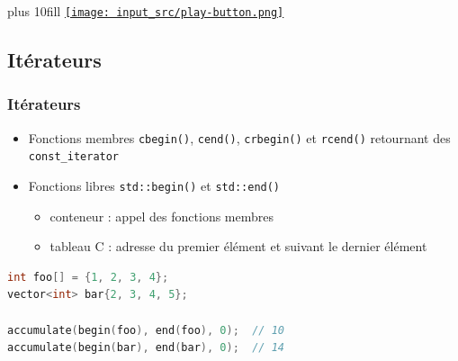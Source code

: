 \documentclass[C++.tex]{subfiles}
\begin{document}
\begin{frame}[fragile]
	\vskip 10mm plus 10fill
	\hfill
	\href{https://godbolt.org/#g:!((g:!((g:!((h:codeEditor,i:(filename:'1',fontScale:14,fontUsePx:'0',j:1,lang:c%2B%2B,selection:(endColumn:1,endLineNumber:17,positionColumn:1,positionLineNumber:17,selectionStartColumn:1,selectionStartLineNumber:17,startColumn:1,startLineNumber:17),source:'%23include+%3Ciostream%3E%0A%23include+%3Cbitset%3E%0A%0Aint+main()%0A%7B%0A++std::bitset%3C5%3E+foo%3B%0A++std::cout+%3C%3C+std::boolalpha+%3C%3C+foo.all()+%3C%3C+!'%5Cn!'%3B%0A%0A++foo.set(2)%3B%0A++std::cout+%3C%3C+std::boolalpha+%3C%3C+foo.all()+%3C%3C+!'%5Cn!'%3B%0A++std::cout+%3C%3C+foo.to_ullong()+%3C%3C+!'%5Cn!'%3B%0A%0A++foo.set()%3B%0A++std::cout+%3C%3C+std::boolalpha+%3C%3C+foo.all()+%3C%3C+!'%5Cn!'%3B%0A++std::cout+%3C%3C+foo.to_ullong()+%3C%3C+!'%5Cn!'%3B%0A%7D%0A'),l:'5',n:'0',o:'C%2B%2B+source+%231',t:'0')),k:50,l:'4',n:'0',o:'',s:0,t:'0'),(g:!((h:executor,i:(argsPanelShown:'1',compilationPanelShown:'0',compiler:g112,compilerOutShown:'0',execArgs:'',execStdin:'',fontScale:14,fontUsePx:'0',j:1,lang:c%2B%2B,libs:!((name:boost,ver:'175')),options:'-std%3Dc%2B%2B11',source:1,stdinPanelShown:'1',tree:'1',wrap:'0'),l:'5',n:'0',o:'Executor+x86-64+gcc+11.2+(C%2B%2B,+Editor+%231)',t:'0')),header:(),k:50,l:'4',n:'0',o:'',s:0,t:'0')),l:'2',n:'0',o:'',t:'0')),version:4}{\texttt{[image: input\_src/play-button.png]}}
\end{frame}

\subsection*{Itérateurs}
\begin{frame}[fragile]
	\frametitle{Itérateurs}
	\begin{itemize}
		\item Fonctions membres \lstinline|cbegin()|, \lstinline|cend()|, \lstinline|crbegin()| et \lstinline|rcend()| retournant des \lstinline|const_iterator|


		\item Fonctions libres \lstinline|std::begin()| et \lstinline|std::end()|
		\begin{itemize}
			\item conteneur : appel des fonctions membres
			\item tableau C : adresse du premier élément et suivant le dernier élément
		\end{itemize}
	\end{itemize}

	\begin{lstlisting}[language=C++]
int foo[] = {1, 2, 3, 4};
vector<int> bar{2, 3, 4, 5};

accumulate(begin(foo), end(foo), 0);  // 10
accumulate(begin(bar), end(bar), 0);  // 14\end{lstlisting}
\end{frame}
\end{document}

